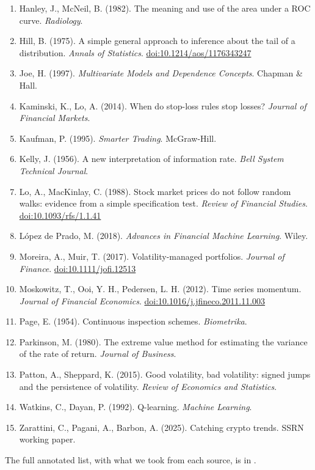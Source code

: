 \documentclass[11pt,a4paper]{article}
\newcommand{\repo}{https://github.com/PriyanshuIITGHY2006/InterIIT_Quant_Jain-Streeter}
\newcommand{\file}[1]{\href{\repo/blob/master/#1}{\texttt{\detokenize{#1}}}}
\theoremstyle{definition}
\begin{document}
\begin{enumerate}[leftmargin=18pt,itemsep=1pt]
\item Hanley, J., McNeil, B. (1982). The meaning and use of the area under a ROC curve. \emph{Radiology}.
\item Hill, B. (1975). A simple general approach to inference about the tail of a distribution. \emph{Annals of Statistics}. \href{https://doi.org/10.1214/aos/1176343247}{doi:10.1214/aos/1176343247}
\item Joe, H. (1997). \emph{Multivariate Models and Dependence Concepts}. Chapman \& Hall.
\item Kaminski, K., Lo, A. (2014). When do stop-loss rules stop losses? \emph{Journal of Financial Markets}.
\item Kaufman, P. (1995). \emph{Smarter Trading}. McGraw-Hill.
\item Kelly, J. (1956). A new interpretation of information rate. \emph{Bell System Technical Journal}.
\item Lo, A., MacKinlay, C. (1988). Stock market prices do not follow random walks: evidence from a simple specification test. \emph{Review of Financial Studies}. \href{https://doi.org/10.1093/rfs/1.1.41}{doi:10.1093/rfs/1.1.41}
\item L\'opez de Prado, M. (2018). \emph{Advances in Financial Machine Learning}. Wiley.
\item Moreira, A., Muir, T. (2017). Volatility-managed portfolios. \emph{Journal of Finance}. \href{https://doi.org/10.1111/jofi.12513}{doi:10.1111/jofi.12513}
\item Moskowitz, T., Ooi, Y. H., Pedersen, L. H. (2012). Time series momentum. \emph{Journal of Financial Economics}. \href{https://doi.org/10.1016/j.jfineco.2011.11.003}{doi:10.1016/j.jfineco.2011.11.003}
\item Page, E. (1954). Continuous inspection schemes. \emph{Biometrika}.
\item Parkinson, M. (1980). The extreme value method for estimating the variance of the rate of return. \emph{Journal of Business}.
\item Patton, A., Sheppard, K. (2015). Good volatility, bad volatility: signed jumps and the persistence of volatility. \emph{Review of Economics and Statistics}.
\item Watkins, C., Dayan, P. (1992). Q-learning. \emph{Machine Learning}.
\item Zarattini, C., Pagani, A., Barbon, A. (2025). Catching crypto trends. SSRN working paper.
\end{enumerate}
The full annotated list, with what we took from each source, is in \file{reports/glossary.md}.
\end{document}
